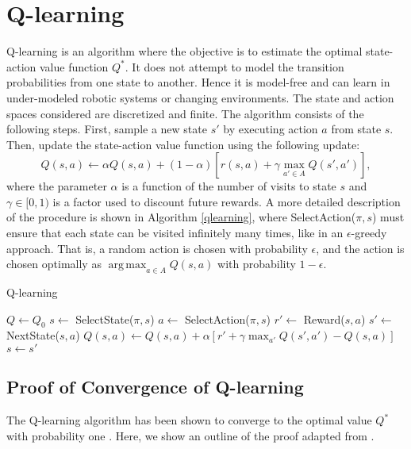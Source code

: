 \documentclass{article} %
\DeclareMathOperator*{\argmax}{arg\,max}
\begin{document}
\section{Q-learning}
Q-learning is an algorithm where the objective is to estimate the optimal state-action value function $Q^*$. It does not attempt to model the transition probabilities from one state to another.  Hence it is model-free and can learn in under-modeled robotic systems or changing environments.  The state and action spaces considered are discretized and finite.  The algorithm consists of the following steps.  First, sample a new state $s'$ by executing action $a$ from state $s$.  Then, update the state-action value function using the following update:
$$Q(s,a) \leftarrow \alpha Q(s,a) + (1-\alpha)[r(s,a) + \gamma \max_{a' \in A}Q(s', a')],$$
where the parameter $\alpha$ is a function of the number of visits to state $s$ and $\gamma \in [0,1)$ is a factor used to discount future rewards.  A more detailed description of the procedure is shown in Algorithm \ref{qlearning}, where SelectAction($\pi,s$) must ensure that each state can be visited infinitely many times, like in an $\epsilon$-greedy approach.  That is, a random action is chosen with probability $\epsilon$, and the action is chosen optimally as $\argmax_{a\in A} Q(s,a)$ with probability $1-\epsilon$.
\begin{algorithm}
 \caption{Q-learning}\label{euclid}
  \begin{algorithmic}[1]
      \State $Q\gets Q_0$
        \State $s \gets $ SelectState($\pi,s$)
        	\State $a \gets$ SelectAction($\pi,s$)
        	\State $r' \gets$ Reward($s,a$)
        	\State $s' \gets$ NextState($s,a$)
        	\State $Q(s,a) \gets Q(s,a) + \alpha[r' + \gamma\max_{a'}Q(s',a')-Q(s,a)]$
        	\State $s \gets s'$
        \EndFor
      \EndFor
      \State {}
    \EndProcedure
  \end{algorithmic}
  \label{qlearning}
\end{algorithm}

\subsection{Proof of Convergence of Q-learning}
The Q-learning algorithm has been shown to converge to the optimal value $Q^*$ with probability one \cite{watkins}.  Here, we show an outline of the proof adapted from \cite{mohri}.  
\end{document}
